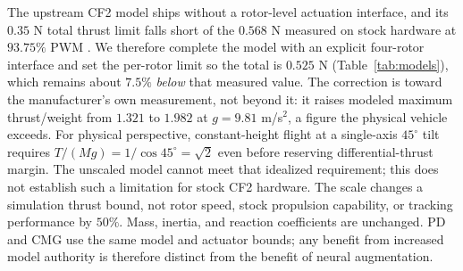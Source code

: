 \documentclass[letterpaper,10pt,conference]{IEEEtran}
\begin{document}
The upstream CF2 model ships without a rotor-level actuation interface, and
its $0.35$ N total thrust limit falls short of the $0.568$ N measured on
stock hardware at $93.75\%$ PWM \cite{bitcrazeThrustMeasurements}. We
therefore complete the model with an explicit four-rotor interface and set
the per-rotor limit so the total is $0.525$ N (Table~\ref{tab:models}),
which remains about $7.5\%$ \emph{below} that measured value. The
correction is toward the manufacturer's own measurement, not beyond it: it
raises modeled maximum thrust/weight from $1.321$ to $1.982$ at
$g=9.81$ m/s$^2$, a figure the physical vehicle exceeds. For physical perspective,
constant-height flight at a single-axis $45^\circ$ tilt requires
$T/(Mg)=1/\cos45^\circ=\sqrt{2}$ even before reserving differential-thrust
margin. The unscaled model cannot meet that idealized requirement; this
does not establish such a limitation for stock CF2 hardware. The scale
changes a simulation thrust bound, not rotor speed, stock propulsion
capability, or tracking performance by $50\%$. Mass, inertia, and reaction
coefficients are unchanged. PD and CMG use the same model and actuator
bounds; any benefit from increased model authority is therefore distinct
from the benefit of neural augmentation.
\end{document}
